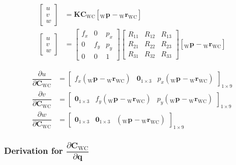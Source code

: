 \documentclass{article}
\renewcommand{\Vec}[1]{{\mathbf{#1}}}
\newcommand{\Mat}[1]{{\mathbf{#1}}}
\newcommand{\Zeros}[2]{{\Vec{0}_{#1\times#2}}}
\newcommand{\quat}{{\Vec{q}}}
\newcommand{\cam}{{\text{C}}}
\newcommand{\world}{{\text{W}}}
\newcommand{\KineNotationTransform}[3]{{{#1}_{#2#3}}}
\newcommand{\KineNotation}[3]{{{{}_{#2}} {#1}_{#2#3}}}
\newcommand{\KineNotationPart}[3]{{{{}_{#2}} {#1}_{#3}}}
\newcommand{\pos}{{\Vec{r}}}
\newcommand{\Pos}[2]{{\KineNotation{\pos}{#1}{#2}}}
\newcommand{\rot}{{\Mat{C}}}
\newcommand{\Rot}[2]{{\KineNotationTransform{\rot}{#1}{#2}}}
\newcommand{\point}{\Vec{p}}
\newcommand{\Pt}[1]{{\KineNotationPart{\point}{#1}{}}}
\newcommand{\camRot}{{\Rot{\world}{\cam}}}
\newcommand{\camPos}{{\Pos{\world}{\cam}}}
\begin{document}
\begin{align}
  \begin{bmatrix} u \\ v \\ w \end{bmatrix}
    &= \Mat{K} \camRot [\Pt{\world} - \camPos]
    \nonumber \\
  \begin{bmatrix} u \\ v \\ w \end{bmatrix}
  &= \begin{bmatrix}
      f_x & 0 & p_x \\
      0 & f_y & p_y \\
      0 & 0 & 1
  \end{bmatrix}
  \begin{bmatrix}
      R_{11} & R_{12} & R_{13} \\
      R_{21} & R_{22} & R_{23} \\
      R_{31} & R_{32} & R_{33}
  \end{bmatrix}
  [\Pt{\world} - \camPos]
  \nonumber
\end{align}

\begin{align}
  \dfrac{\partial{u}}{\partial{\camRot}} &=
      \begin{bmatrix}
        f_{x} (\Pt{\world} - \camPos) &
        \Zeros{1}{3} &
        p_{x} (\Pt{\world} - \camPos)
      \end{bmatrix}_{1 \times 9} \\
  \dfrac{\partial{v}}{\partial{\camRot}} &=
    \begin{bmatrix}
      \Zeros{1}{3} &
      f_{y} (\Pt{\world} - \camPos) &
      p_{y} (\Pt{\world} - \camPos)
  \end{bmatrix}_{1 \times 9} \\
  \dfrac{\partial{w}}{\partial{\camRot}} &=
    \begin{bmatrix}
      \Zeros{1}{3} &
      \Zeros{1}{3} &
      (\Pt{\world} - \camPos)
    \end{bmatrix}_{1 \times 9}
\end{align}


\subsubsection*{Derivation for \color{cyan}
$\dfrac{\partial{\camRot}}{\partial{\quat}}$}
\end{document}
